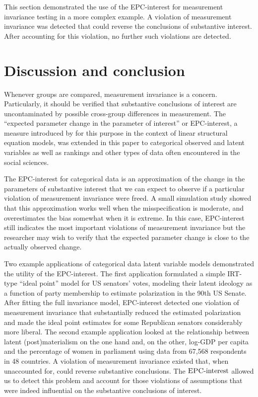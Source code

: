 \documentclass[letterpaper,12pt]{article}
\newcommand{\da}{\textrm{{\sc {EPC}}-interest}}
\begin{document}
\bigskip
This section demonstrated the use of the EPC-interest for measurement invariance testing in a more complex example. A violation of measurement invariance was detected that could reverse the conclusions of substantive interest. After accounting for this violation, no further such violations are detected. 


\section{Discussion and conclusion}
\label{sec:discussion}


Whenever groups are compared, measurement invariance is a concern. Particularly, it should be verified that substantive conclusions of interest are uncontaminated by possible cross-group differences in measurement. The ``expected parameter change in the parameter of interest'' or EPC-interest, a measure introduced by \citet{Oberski:WP:EPC-interest} for this purpose in the context of linear structural equation models, was extended in this paper  to categorical observed and latent variables as well as rankings and other types of data often encountered in the social sciences. 

The EPC-interest for categorical data is an approximation of the change in the parameters of substantive interest that we can expect to observe if a particular violation of measurement invariance were freed. A small simulation study showed that this approximation works well when the misspecification is moderate, and overestimates the bias somewhat when it is extreme. In this case, EPC-interest still indicates the most important violations of measurement invariance but the researcher may wish to verify that the expected parameter change is close to the actually observed change. 

Two example applications of categorical data latent variable models demonstrated the utility of the EPC-interest. The first application formulated a simple IRT-type ``ideal point'' model for US senators' votes, modeling their latent ideology as a function of party membership to estimate polarization in the 90th US Senate. After fitting the full invariance model, EPC-interest detected one violation of measurement invariance that substantially reduced the estimated polarization and made the ideal point estimates for some Republican senators considerably more liberal. The second example application looked at the relationship between latent (post)materialism on the one hand and, on the other, log-GDP per capita and the percentage of women in parliament using data from  67,568 respondents in 48 countries. A violation of measurement invariance existed that, when unaccounted for, could reverse substantive conclusions. The $\da{}$ allowed us to detect this problem and account for those violations of assumptions that were indeed influential on the substantive conclusions of interest.
\end{document}

